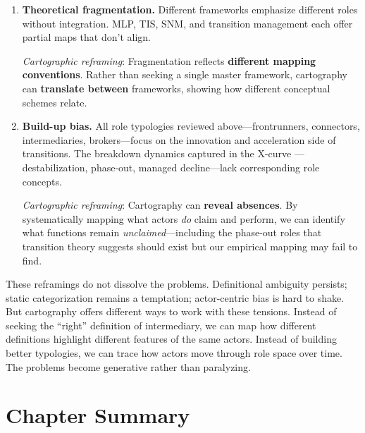 \documentclass[../main.tex]{subfiles}
\begin{document}
\begin{enumerate}[leftmargin=*, itemsep=0.8em]
\emph{Cartographic reframing}: Multimodal cartography \textbf{integrates} rather than chooses. Theory guides what features to map; multiple data sources triangulate positions; qualitative insight interprets quantitative patterns.

\item \textbf{Theoretical fragmentation.} Different frameworks emphasize different roles without integration. MLP, TIS, SNM, and transition management each offer partial maps that don't align.

\emph{Cartographic reframing}: Fragmentation reflects \textbf{different mapping conventions}. Rather than seeking a single master framework, cartography can \textbf{translate between} frameworks, showing how different conceptual schemes relate.

\item \textbf{Build-up bias.} All role typologies reviewed above---frontrunners, connectors, intermediaries, brokers---focus on the innovation and acceleration side of transitions. The breakdown dynamics captured in the X-curve \parencite{hebinck2022xcurve}---destabilization, phase-out, managed decline---lack corresponding role concepts.

\emph{Cartographic reframing}: Cartography can \textbf{reveal absences}. By systematically mapping what actors \emph{do} claim and perform, we can identify what functions remain \emph{unclaimed}---including the phase-out roles that transition theory suggests should exist but our empirical mapping may fail to find.

\end{enumerate}

These reframings do not dissolve the problems. Definitional ambiguity persists; static categorization remains a temptation; actor-centric bias is hard to shake. But cartography offers different ways to work with these tensions. Instead of seeking the ``right'' definition of intermediary, we can map how different definitions highlight different features of the same actors. Instead of building better typologies, we can trace how actors move through role space over time. The problems become generative rather than paralyzing.


\section{Chapter Summary}
\end{document}
